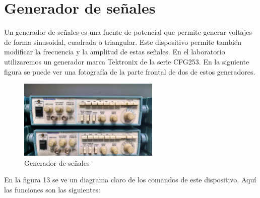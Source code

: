 \documentclass{scrartcl}
\begin{document}
\section{Generador de señales}
Un generador de señales es una fuente de potencial que permite generar voltajes de forma sinusoidal, cuadrada o triangular. Este dispositivo permite también modificar la frecuencia y la amplitud de estas señales. En el laboratorio utilizaremos un generador marca Tektronix de la serie CFG253. En la siguiente figura se puede ver una fotografía de la parte frontal de dos de estos generadores.\\

\begin{figure}[h!]
	\centering
	\includegraphics[width=0.60\textwidth,height=0.25\textheight]{generador}
	\caption{Generador de señales}
\end{figure}

En la figura 13 se ve un diagrama claro de los comandos de este dispositivo. Aquí las funciones son las siguientes:
\end{document}
